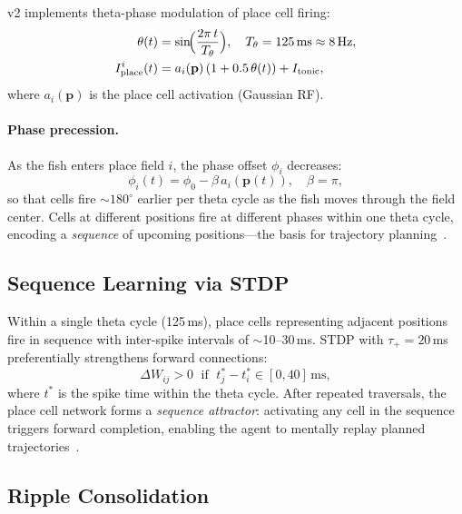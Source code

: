 \documentclass[11pt,a4paper]{article}
\begin{document}
v2 implements theta-phase modulation of place cell firing:
\begin{equation}\label{eq:theta}
\begin{aligned}
  \theta(t) &= \sin\!\Bigl(\frac{2\pi\,t}{T_\theta}\Bigr),
  \quad T_\theta = 125\,\text{ms} \approx 8\,\text{Hz}, \\
  I_\text{place}^i(t) &= a_i(\mathbf{p})\,(1 + 0.5\,\theta(t)) + I_\text{tonic},
\end{aligned}
\end{equation}
where $a_i(\mathbf{p})$ is the place cell activation (Gaussian RF).

\paragraph{Phase precession.}
As the fish enters place field $i$, the phase offset $\phi_i$ decreases:
\begin{equation}\label{eq:precession}
  \phi_i(t) = \phi_0 - \beta\,a_i(\mathbf{p}(t)),
  \quad \beta = \pi,
\end{equation}
so that cells fire $\sim 180^{\circ}$ earlier per theta cycle as the fish moves
through the field center.
Cells at different positions fire at different phases within one theta cycle,
encoding a \emph{sequence} of upcoming positions---the basis for
trajectory planning~\cite{skaggs1996}.

\subsection{Sequence Learning via STDP}

Within a single theta cycle (125\,ms), place cells representing adjacent
positions fire in sequence with inter-spike intervals of $\sim$10--30\,ms.
STDP with $\tau_+ = 20$\,ms preferentially strengthens forward connections:
\begin{equation}
  \Delta W_{ij} > 0 \;\text{ if }\; t_j^* - t_i^* \in [0, 40]\,\text{ms},
\end{equation}
where $t^*$ is the spike time within the theta cycle.
After repeated traversals, the place cell network forms a \emph{sequence
attractor}: activating any cell in the sequence triggers forward completion,
enabling the agent to mentally replay planned trajectories~\cite{moser2008}.

\subsection{Ripple Consolidation}
\end{document}
